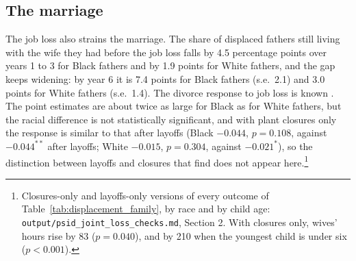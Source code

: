 \subsection{The marriage}

The job loss also strains the marriage. The share of displaced fathers still living with the wife they had before the
job loss falls by 4.5 percentage points over years 1 to 3 for Black fathers and by 1.9 points for White fathers, and the
gap keeps widening: by year 6 it is 7.4 points for Black fathers (s.e.\ 2.1) and 3.0 points for White fathers (s.e.\
1.4). The divorce response to job loss is known \citep{charles2004job}. The point estimates are about twice as large
for Black as for White fathers, but the racial difference is not statistically significant, and with plant closures
only the response is similar to that after layoffs (Black $-0.044$, $p=0.108$, against $-0.044^{**}$ after layoffs;
White $-0.015$, $p=0.304$, against $-0.021^{*}$), so the distinction between layoffs and closures that
\citet{charles2004job} find does not appear here.\footnote{Closures-only and layoffs-only versions of every outcome of
Table~\ref{tab:displacement_family}, by race and by child age: \texttt{output/psid\_joint\_loss\_checks.md},
Section 2. With closures only, wives' hours rise by 83 ($p=0.040$), and by 210 when the youngest child is under six
($p<0.001$).}

